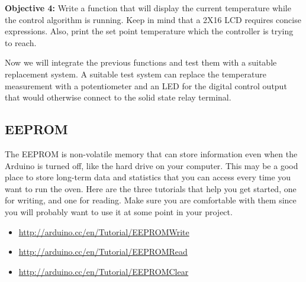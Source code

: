\documentclass[10pt]{report}
\begin{document}
\par \textbf{Objective 4:} Write a function that will display the current temperature while the control algorithm is running. Keep in mind that a 2X16 LCD requires concise expressions. Also, print the set point temperature which the controller is trying to reach. 

\par 
\indent Now we will integrate the previous functions and test them with a suitable replacement system. A suitable test system can replace the temperature measurement with a potentiometer and an LED for the digital control output that would otherwise connect to the solid state relay terminal. 

\subsection*{\textbf{EEPROM}}
The EEPROM is non-volatile memory that can store information even when the Arduino is turned off, like the hard drive on your computer. This may be a good place to store long-term data and statistics that you can access every time you want to run the oven. Here are the three tutorials that help you get started, one for writing, and one for reading. Make sure you are comfortable with them since you will probably want to use it at some point in your project.
\begin{itemize}
\item \url{http://arduino.cc/en/Tutorial/EEPROMWrite} 
\item \url{http://arduino.cc/en/Tutorial/EEPROMRead}
\item \url{http://arduino.cc/en/Tutorial/EEPROMClear}

\end{itemize}
\end{document}
